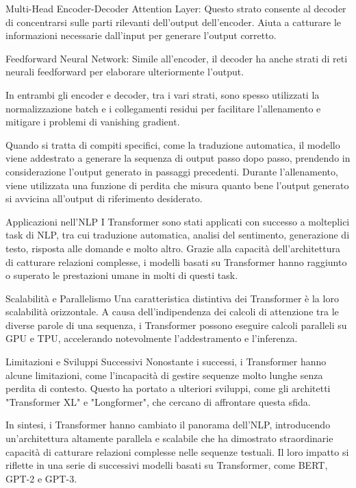 Multi-Head Encoder-Decoder Attention Layer: Questo strato consente al decoder di concentrarsi sulle parti rilevanti dell'output dell'encoder. Aiuta a catturare le informazioni necessarie dall'input per generare l'output corretto.

Feedforward Neural Network: Simile all'encoder, il decoder ha anche strati di reti neurali feedforward per elaborare ulteriormente l'output.

In entrambi gli encoder e decoder, tra i vari strati, sono spesso utilizzati la normalizzazione batch e i collegamenti residui per facilitare l'allenamento e mitigare i problemi di vanishing gradient.

Quando si tratta di compiti specifici, come la traduzione automatica, il modello viene addestrato a generare la sequenza di output passo dopo passo, prendendo in considerazione l'output generato in passaggi precedenti. Durante l'allenamento, viene utilizzata una funzione di perdita che misura quanto bene l'output generato si avvicina all'output di riferimento desiderato.

Applicazioni nell'NLP
I Transformer sono stati applicati con successo a molteplici task di NLP, tra cui traduzione automatica, analisi del sentimento, generazione di testo, risposta alle domande e molto altro. Grazie alla capacità dell'architettura di catturare relazioni complesse, i modelli basati su Transformer hanno raggiunto o superato le prestazioni umane in molti di questi task.

Scalabilità e Parallelismo
Una caratteristica distintiva dei Transformer è la loro scalabilità orizzontale. A causa dell'indipendenza dei calcoli di attenzione tra le diverse parole di una sequenza, i Transformer possono eseguire calcoli paralleli su GPU e TPU, accelerando notevolmente l'addestramento e l'inferenza.

Limitazioni e Sviluppi Successivi
Nonostante i successi, i Transformer hanno alcune limitazioni, come l'incapacità di gestire sequenze molto lunghe senza perdita di contesto. Questo ha portato a ulteriori sviluppi, come gli architetti "Transformer XL" e "Longformer", che cercano di affrontare questa sfida.

In sintesi, i Transformer hanno cambiato il panorama dell'NLP, introducendo un'architettura altamente parallela e scalabile che ha dimostrato straordinarie capacità di catturare relazioni complesse nelle sequenze testuali. Il loro impatto si riflette in una serie di successivi modelli basati su Transformer, come BERT, GPT-2 e GPT-3.